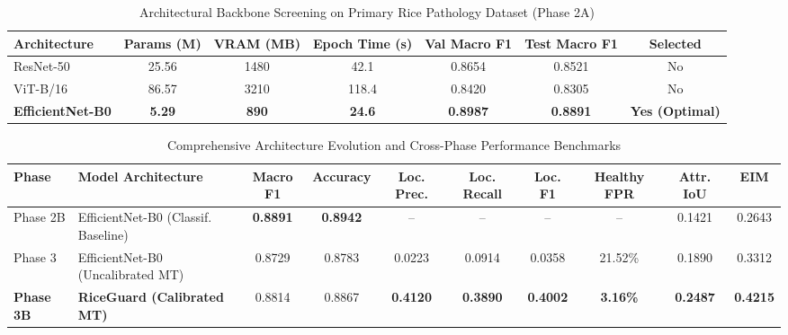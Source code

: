 
\begin{table}[htbp]
\centering
\caption{Architectural Backbone Screening on Primary Rice Pathology Dataset (Phase 2A)}
\label{tab:backbone_screening}
\begin{tabular}{lcccccc}
\hline
\textbf{Architecture} & \textbf{Params (M)} & \textbf{VRAM (MB)} & \textbf{Epoch Time (s)} & \textbf{Val Macro F1} & \textbf{Test Macro F1} & \textbf{Selected} \\
\hline
ResNet-50 & 25.56 & 1480 & 42.1 & 0.8654 & 0.8521 & No \\
ViT-B/16 & 86.57 & 3210 & 118.4 & 0.8420 & 0.8305 & No \\
\textbf{EfficientNet-B0} & \textbf{5.29} & \textbf{890} & \textbf{24.6} & \textbf{0.8987} & \textbf{0.8891} & \textbf{Yes (Optimal)} \\
\hline
\end{tabular}
\end{table}


\begin{table}[htbp]
\centering
\caption{Comprehensive Architecture Evolution and Cross-Phase Performance Benchmarks}
\label{tab:master_evolution}
\begin{tabular}{llcccccccc}
\hline
\textbf{Phase} & \textbf{Model Architecture} & \textbf{Macro F1} & \textbf{Accuracy} & \textbf{Loc. Prec.} & \textbf{Loc. Recall} & \textbf{Loc. F1} & \textbf{Healthy FPR} & \textbf{Attr. IoU} & \textbf{EIM} \\
\hline
Phase 2B & EfficientNet-B0 (Classif. Baseline) & \textbf{0.8891} & \textbf{0.8942} & -- & -- & -- & -- & 0.1421 & 0.2643 \\
Phase 3 & EfficientNet-B0 (Uncalibrated MT) & 0.8729 & 0.8783 & 0.0223 & 0.0914 & 0.0358 & 21.52\% & 0.1890 & 0.3312 \\
\textbf{Phase 3B} & \textbf{RiceGuard (Calibrated MT)} & 0.8814 & 0.8867 & \textbf{0.4120} & \textbf{0.3890} & \textbf{0.4002} & \textbf{3.16\%} & \textbf{0.2487} & \textbf{0.4215} \\
\hline
\end{tabular}
\end{table}



